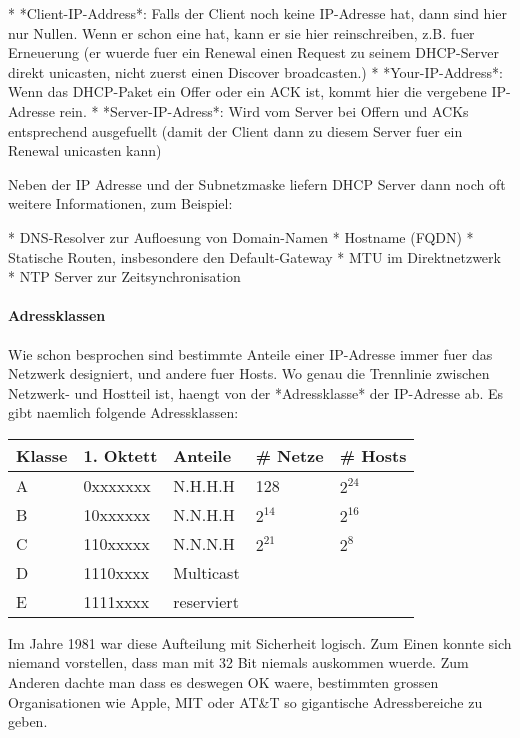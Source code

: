 * *Client-IP-Address*: Falls der Client noch keine IP-Adresse hat, dann sind
  hier nur Nullen. Wenn er schon eine hat, kann er sie hier reinschreiben,
  z.B. fuer Erneuerung (er wuerde fuer ein Renewal einen Request zu seinem
  DHCP-Server direkt unicasten, nicht zuerst einen Discover broadcasten.)
* *Your-IP-Address*: Wenn das DHCP-Paket ein Offer oder ein ACK ist, kommt hier
  die vergebene IP-Adresse rein.
* *Server-IP-Adress*: Wird vom Server bei Offern und ACKs entsprechend
  ausgefuellt (damit der Client dann zu diesem Server fuer ein Renewal unicasten
  kann)

Neben der IP Adresse und der Subnetzmaske liefern DHCP Server dann noch oft
weitere Informationen, zum Beispiel:

* DNS-Resolver zur Aufloesung von Domain-Namen
* Hostname (FQDN)
* Statische Routen, insbesondere den Default-Gateway
* MTU im Direktnetzwerk
* NTP Server zur Zeitsynchronisation

\paragraph{Adressklassen} 

Wie schon besprochen sind bestimmte Anteile einer IP-Adresse immer fuer das
Netzwerk designiert, und andere fuer Hosts. Wo genau die Trennlinie zwischen
Netzwerk- und Hostteil ist, haengt von der *Adressklasse* der IP-Adresse ab. Es
gibt naemlich folgende Adressklassen:

\begin{tabular}{|l|l|l|l|l|}
Klasse & 1. Oktett & Anteile & \# Netze & \# Hosts \\\hline
   A    & 0xxxxxxx  & N.H.H.H &  128   &  $2^24$ \\
   B    & 10xxxxxx  & N.N.H.H &  $2^14$  &  $2^16$ \\
   C    & 110xxxxx  & N.N.N.H &  $2^21$  &  $2^8$  \\
   D    & 1110xxxx  &        Multicast          \\
   E    & 1111xxxx  &        reserviert         \\
\hline
\end{tabular}

Im Jahre 1981 war diese Aufteilung mit Sicherheit logisch. Zum Einen konnte sich
niemand vorstellen, dass man mit 32 Bit niemals auskommen wuerde. Zum Anderen
dachte man dass es deswegen OK waere, bestimmten grossen Organisationen wie
Apple, MIT oder AT\&T so gigantische Adressbereiche zu geben.

